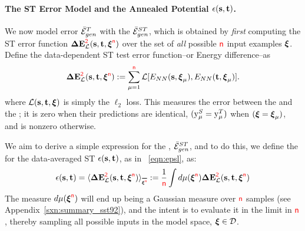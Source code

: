 \paragraph{The ST Error Model and the Annealed Potential $\epsilon({\mathbf{s}}, {\mathbf{t}} )$.}
We now model \Teacher error $\bar{\mathcal{E}}_{gen}^{T}$ with the
\emph{\AverageSTGeneralizationError} $\bar{\mathcal{E}}^{ST}_{gen}$, which is obtained
 by \emph{first} computing the ST error function
$\mathbf{\Delta {E}}^{{\color{red}\sf{2}}}_{\mathcal{L}}({\mathbf{s}},{\mathbf{t}},\boldsymbol{\xi}^{{\color{red}\sf{n}}})$
over the set of \emph{all} possible ${\color{red}\sf{n}}$ input examples $\boldsymbol{\xi}$.  Define the data-dependent ST test error function--or Energy difference--as 
\begin{align}
\label{eqn:DE_L}
\mathbf{\Delta {E}}^{{\color{red}\sf{2}}}_{\mathcal{L}}({\mathbf{s}},{\mathbf{t}},\boldsymbol{\xi}^{{\color{red}\sf{n}}}):=\sum_{\mu=1}^{{\color{red}\sf{n}}}\mathcal{L}[E_{NN}({\mathbf{s}},\boldsymbol{\xi}_{\mu}),E_{NN}({\mathbf{t}},\boldsymbol{\xi}_{\mu})]  .
\end{align}
where $\mathcal{L}({\mathbf{s}},{\mathbf{t}}, \boldsymbol{\xi})$ is simply the $\ell_2$ loss.  This measures the error
between the \Student and the \Teacher; it is zero when their predictions are identical,
$(\mathrm{y}_{\mu}^{S}=\mathrm{y}_{\mu}^{T})$ when $(\boldsymbol{\xi}=\boldsymbol{\xi}_{\mu})$, and is nonzero otherwise.

We aim to derive a simple expression for the  \AverageSTGeneralizationError, $\bar{\mathcal{E}}^{ST}_{gen}$, and to do this, 
we define the  \EffectivePotential for the data-averaged ST \GeneralizationError $\epsilon({\mathbf{s}},{\mathbf{t}})$, as in \EQN~\ref{eqn:epsl}, as:
\begin{align}
\label{eqn:STerror}
\EPSLSTx = \langle\DETOPSTL\rangle_{\AVGNDXI}:=\frac{1}{\ND}\int d\mu(\NDXI)\DETOPSTL
\end{align}
The measure $d\mu(\boldsymbol{\xi}^{{\color{red}\sf{n}}})$ will end up being a Gaussian measure over ${\color{red}\sf{n}}$ samples
(see Appendix~\ref{sxn:summary_sst92}), and the intent is to evaluate it
in the \LargeN limit in ${\color{red}\sf{n}}$, thereby sampling all possible inputs in the model space, $\boldsymbol{\xi}\in\mathcal{D}$.

